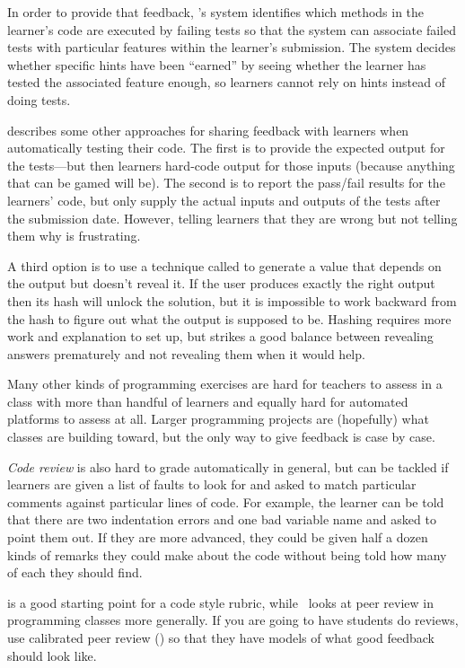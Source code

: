 In order to provide that feedback,
\cite{Buff2015}'s system identifies which methods in the learner's code
are executed by failing tests
so that the system can associate failed tests
with particular features within the learner's submission.
The system decides whether specific hints have been ``earned''
by seeing whether the learner has tested the associated feature enough,
so learners cannot rely on hints instead of doing tests.

\cite{Srid2016} describes some other approaches for sharing feedback with learners
when automatically testing their code.
The first is to provide the expected output for the tests---but
then learners hard-code output for those inputs
(because anything that can be gamed will be).
The second is to report the pass/fail results for the learners' code,
but only supply the actual inputs and outputs of the tests after the submission date.
However,
telling learners that they are wrong but not telling them why is frustrating.

A third option is to use a technique called 
to generate a value that depends on the output but doesn't reveal it.
If the user produces exactly the right output
then its hash will unlock the solution,
but it is impossible to work backward from the hash to figure out
what the output is supposed to be.
Hashing requires more work and explanation to set up,
but strikes a good balance between revealing answers prematurely
and not revealing them when it would help.


Many other kinds of programming exercises
are hard for teachers to assess in a class with more than handful of learners
and equally hard for automated platforms to assess at all.
Larger programming projects are (hopefully) what classes are building toward,
but the only way to give feedback is case by case.

\emph{Code review} is also hard to grade automatically in general,
but can be tackled if learners are given a list of faults to look for
and asked to match particular comments against particular lines of code.
For example,
the learner can be told that there are two indentation errors and one bad variable name
and asked to point them out.
If they are more advanced,
they could be given half a dozen kinds of remarks they could make about the code
without being told how many of each they should find.

\cite{Steg2016b} is a good starting point for a code style rubric,
while~\cite{Luxt2009} looks at peer review in programming classes more generally.
If you are going to have students do reviews,
use calibrated peer review ()
so that they have models of what good feedback should look like.

